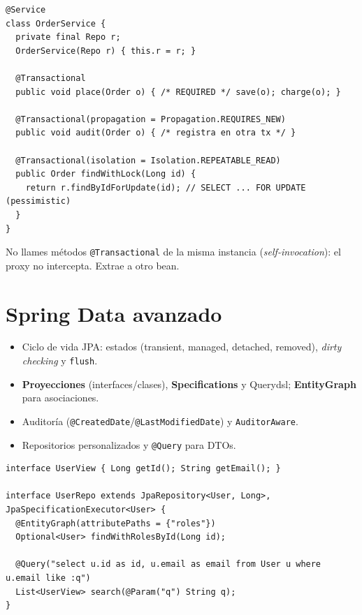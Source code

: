 \documentclass[11pt,a4paper]{article}
\begin{document}
\begin{lstlisting}[style=javastyle, caption={Propagación y locking}]
@Service
class OrderService {
  private final Repo r;
  OrderService(Repo r) { this.r = r; }

  @Transactional
  public void place(Order o) { /* REQUIRED */ save(o); charge(o); }

  @Transactional(propagation = Propagation.REQUIRES_NEW)
  public void audit(Order o) { /* registra en otra tx */ }

  @Transactional(isolation = Isolation.REPEATABLE_READ)
  public Order findWithLock(Long id) {
    return r.findByIdForUpdate(id); // SELECT ... FOR UPDATE (pessimistic)
  }
}
\end{lstlisting}

\begin{warnbox}
No llames métodos \texttt{@Transactional} de la misma instancia (\emph{self-invocation}): el proxy no intercepta. Extrae a otro bean.
\end{warnbox}

\section{Spring Data avanzado}
\begin{itemize}[leftmargin=*]
  \item Ciclo de vida JPA: estados (transient, managed, detached, removed), \emph{dirty checking} y \texttt{flush}.
  \item \textbf{Proyecciones} (interfaces/clases), \textbf{Specifications} y Querydsl; \textbf{EntityGraph} para asociaciones.
  \item Auditoría (\texttt{@CreatedDate}/\texttt{@LastModifiedDate}) y \texttt{AuditorAware}.
  \item Repositorios personalizados y \texttt{@Query} para DTOs.
\end{itemize}

\begin{lstlisting}[style=javastyle, caption={EntityGraph y proyecciones}] 
interface UserView { Long getId(); String getEmail(); }

interface UserRepo extends JpaRepository<User, Long>, JpaSpecificationExecutor<User> {
  @EntityGraph(attributePaths = {"roles"})
  Optional<User> findWithRolesById(Long id);

  @Query("select u.id as id, u.email as email from User u where u.email like :q")
  List<UserView> search(@Param("q") String q);
}
\end{lstlisting}
\end{document}
